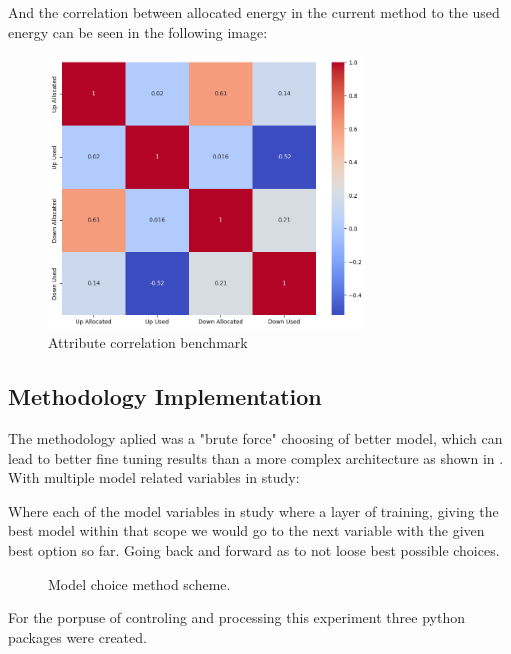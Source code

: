 And the correlation between allocated energy in the current method to the used energy can be seen in the following image:
\begin{figure}[H]
    \centering
    \includegraphics[width=0.75\textwidth]{plots/correlation_heatmap_benchmark.png}
    \caption{Attribute correlation benchmark}
    \label{fig:Attribute_correlation_benchmark}
  \end{figure}

  


\subsection{Methodology Implementation}

The methodology aplied was a "brute force" choosing of better model, which can lead to better fine tuning results than a more complex architecture as shown in \cite{Liu2022}. With multiple model related variables in study:\par



Where each of the model variables in study where a layer of training, giving the best model within that scope we would go to the next variable with the given best option so far. Going back and forward as to not loose best possible choices.\par


\begin{figure}[H]
	\centering
	\resizebox{\linewidth}{!}{}
	\caption{Model choice method scheme.}
	\label{fig:method_training}
\end{figure}

For the porpuse of controling and processing this experiment three python packages were created.

